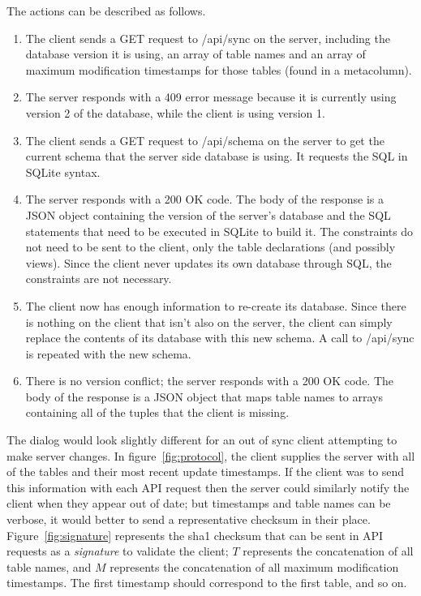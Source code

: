 \documentclass[journal]{IEEEtran}
\begin{document}
The actions can be described as follows. 

\begin{enumerate}

\item The client sends a GET request to /api/sync on the server, including the database version it is using, an array of table names and an array of maximum modification timestamps for those tables (found in a metacolumn).

\item The server responds with a 409 error message because it is currently using version 2 of the database, while the client is using version 1.

\item The client sends a GET request to /api/schema on the server to get the current schema that the server side database is using. It requests the SQL in SQLite syntax.

\item The server responds with a 200 OK code. The body of the response is a JSON object containing the version of the server's database and the SQL statements that need to be executed in SQLite to build it. The constraints do not need to be sent to the client, only the table declarations (and possibly views). Since the client never updates its own database through SQL, the constraints are not necessary. 

\item The client now has enough information to re-create its database. Since there is nothing on the client that isn't also on the server, the client can simply replace the contents of its database with this new schema. A call to /api/sync is repeated with the new schema. 

\item There is no version conflict; the server responds with a 200 OK code. The body of the response is a JSON object that maps table names to arrays containing all of the tuples that the client is missing. 

\end{enumerate}


The dialog would look slightly different for an out of sync client attempting to make server changes. In figure~\ref{fig:protocol}, the client supplies the server with all of the tables and their most recent update timestamps. If the client was to send this information with each API request then the server could similarly notify the client when they appear out of date; but timestamps and table names can be verbose, it would better to send a representative checksum in their place. Figure~\ref{fig:signature} represents the sha1 checksum that can be sent in API requests as a \textit{signature} to validate the client; $T$ represents the concatenation of all table names, and $M$ represents the concatenation of all maximum modification timestamps. The first timestamp should correspond to the first table, and so on.
\end{document}
